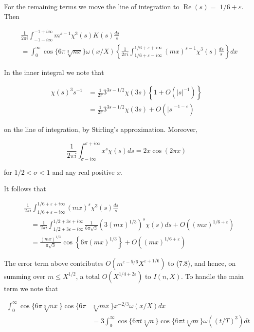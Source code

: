 \documentclass[10pt]{article}
\begin{document}
For the remaining terms we move the line of integration to $\operatorname{Re}(s)=$ $1 / 6+\varepsilon$. Then


\begin{align*}
& \frac{1}{2 \pi i} \int_{-1-i \infty}^{-1+i \infty} m^{s-1} \chi^{3}(s) K(s) \frac{d s}{s}  \tag{7.8}\\
& =\int_{0}^{\infty} \cos \{6 \pi \sqrt[3]{n x}\} \omega(x / X)\left\{\frac{1}{2 \pi i} \int_{1 / 6+\varepsilon-i \infty}^{1 / 6+\varepsilon+i \infty}(m x)^{s-1} \chi^{3}(s) \frac{d s}{s}\right\} d x
\end{align*}


In the inner integral we note that

$$
\begin{aligned}
\chi(s)^{3} s^{-1} & =\frac{1}{2 \pi} 3^{3 s-1 / 2} \chi(3 s)\left\{1+O\left(|s|^{-1}\right)\right\} \\
& =\frac{1}{2 \pi} 3^{3 s-1 / 2} \chi(3 s)+O\left(|s|^{-1-\varepsilon}\right)
\end{aligned}
$$

on the line of integration, by Stirling's approximation. Moreover,

$$
\frac{1}{2 \pi i} \int_{\sigma-i \infty}^{\sigma+i \infty} x^{s} \chi(s) d s=2 x \cos (2 \pi x)
$$

for $1 / 2<\sigma<1$ and any real positive $x$.

It follows that

$$
\begin{aligned}
& \frac{1}{2 \pi i} \int_{1 / 6+\varepsilon-i \infty}^{1 / 6+\varepsilon+i \infty}(m x)^{s} \chi^{3}(s) \frac{d s}{s} \\
& \quad=\frac{1}{2 \pi i} \int_{1 / 2+3 \varepsilon-i \infty}^{1 / 2+3 \varepsilon+i \infty} \frac{1}{6 \pi \sqrt{3}}\left(3(m x)^{1 / 3}\right)^{s} \chi(s) d s+O\left((m x)^{1 / 6+\varepsilon}\right) \\
& \quad=\frac{(m x)^{1 / 3}}{\pi \sqrt{3}} \cos \left\{6 \pi(m x)^{1 / 3}\right\}+O\left((m x)^{1 / 6+\varepsilon}\right)
\end{aligned}
$$

The error term above contributes $O\left(m^{\varepsilon-5 / 6} X^{\varepsilon+1 / 6}\right)$ to (7.8), and hence, on summing over $m \leq X^{1 / 2}$, a total $O\left(X^{1 / 4+2 \varepsilon}\right)$ to $I(n, X)$. To handle the main term we note that

$$
\begin{aligned}
\int_{0}^{\infty} \cos \{6 \pi \sqrt[3]{n x}\} \cos \{6 \pi & \sqrt[3]{m x}\} x^{-2 / 3} \omega(x / X) d x \\
& =3 \int_{0}^{\infty} \cos \{6 \pi t \sqrt[3]{n}\} \cos \{6 \pi t \sqrt[3]{m}\} \omega\left((t / T)^{3}\right) d t
\end{aligned}
$$
\end{document}

